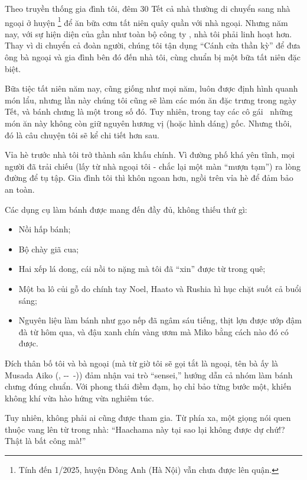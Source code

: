 \documentclass[../main.tex]{subfiles}
\begin{document}
Theo truyền thống gia đình tôi, đêm 30 Tết cả nhà thường di chuyển sang nhà ngoại ở huyện \footnote{Tính đến 1/2025, huyện Đông Anh (Hà Nội) vẫn chưa được lên quận.} để ăn bữa cơm tất niên quây quần với nhà ngoại. Nhưng năm nay, với sự hiện diện của gần như toàn bộ công ty \hll, nhà tôi phải linh hoạt hơn. Thay vì di chuyển cả đoàn người, chúng tôi tận dụng ``Cánh cửa thần kỳ'' để đưa ông bà ngoại và gia đình bên đó đến nhà tôi, cùng chuẩn bị một bữa tất niên đặc biệt.

Bữa tiệc tất niên năm nay, cũng giống như mọi năm, luôn được định hình quanh món lẩu, nhưng lần này chúng tôi cũng sẽ làm các món ăn đặc trưng trong ngày Tết, và bánh chưng là một trong số đó. Tuy nhiên, trong tay các cô gái \hll\ những món ăn này không còn giữ nguyên hương vị (hoặc hình dáng) gốc. Nhưng thôi, đó là câu chuyện tôi sẽ kể chi tiết hơn sau.

Vỉa hè trước nhà tôi trở thành sân khấu chính. Vì đường phố khá yên tĩnh, mọi người đã trải chiếu (lấy từ nhà ngoại tôi - chắc lại một màn ``mượn tạm'') ra lòng đường để tụ tập. Gia đình tôi thì khôn ngoan hơn, ngồi trên vỉa hè để đảm bảo an toàn.

Các dụng cụ làm bánh được mang đến đầy đủ, không thiếu thứ gì:

\begin{itemize}
    \item Nồi hấp bánh;
    \item Bộ chày giã cua;
    \item Hai xếp lá dong, cái nồi to nặng mà tôi đã ``xin'' được từ trong quê;
    \item Một ba lô củi gỗ do chính tay Noel, Haato và Rushia hì hục chặt suốt cả buổi sáng;
    \item Nguyên liệu làm bánh như gạo nếp đã ngâm sáu tiếng, thịt lợn được ướp đậm đà từ hôm qua, và đậu xanh chín vàng ươm mà Miko bằng cách nào đó có được.
\end{itemize}

Đích thân bố tôi và bà ngoại (mà từ giờ tôi sẽ gọi tắt là ngoại, tên bà ấy là Musada Aiko (, --\ -)) đảm nhận vai trò ``sensei,'' hướng dẫn cả nhóm làm bánh chưng đúng chuẩn. Với phong thái điềm đạm, họ chỉ bảo từng bước một, khiến không khí vừa hào hứng vừa nghiêm túc.

Tuy nhiên, không phải ai cũng được tham gia. Từ phía xa, một giọng nói quen thuộc vang lên từ trong nhà: ``Haachama này tại sao lại không được dự chứ!? Thật là bất công mà!''
\end{document}
